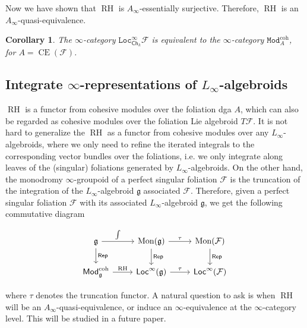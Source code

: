 \documentclass[12pt]{amsart}
\newtheorem{cor}[thm]{Corollary}
\theoremstyle{definition}
\theoremstyle{remark}
\numberwithin{equation}{section}
\newcommand{\CF}{{\mathcal F}}
\newcommand{\A}{{A}}
\newcommand{\1}{{\mathbb{1}}}
\newcommand{\g}{\mathfrak{g}}
\newcommand{\CE}{\operatorname{CE}}
\newcommand{\Mod}{\mathsf{Mod}}
\newcommand{\Modi}{\mathtt{Mod}}
\newcommand{\Ch}{\mathsf{Ch}}
\newcommand{\rep}{\mathsf{Rep}}
\newcommand{\Loc}{\mathsf{Loc}}
\newcommand{\loci}{\mathtt{Loc}}
\newcommand{\RH}{\operatorname{RH}}
\newcommand{\coh}{{\operatorname{coh}}}
\newcommand{\mon}{\operatorname{Mon}}
\newcommand{\li}{L_{\infty}}
\begin{document}
Now we have shown that $\RH$ is $A_{\infty}$-essentially surjective. Therefore, $\RH$ is an $A_{\infty}$-quasi-equivalence.

\begin{cor}
The $\infty$-category $\loci^{\infty}_{\Ch_k}\CF$ is equivalent to the $\infty$-category $\Modi_{\A}^{\coh}$, for $\A = \CE(\CF)$.
\end{cor}
\subsection{Integrate $\infty$-representations of $L_{\infty}$-algebroids}

$\RH$ is a functor from cohesive modules over the foliation dga $A$, which can also be regarded as cohesive modules over the foliation Lie algebroid $T\CF$. 
It is not hard to generalize the $\RH$ as a functor from cohesive modules over any $\li$-algebroids, where we only need to refine the iterated integrals to the corresponding vector bundles over the foliations, i.e. we only integrate along leaves of the (singular) foliations generated by  $\li$-algebroids. On the other hand, the monodromy $\infty$-groupoid of a perfect singular foliation $\CF$ is the truncation of the integration of the $\li$-algebroid $\g$ associated $\CF$. Therefore, given a perfect singular foliation $\CF$ with its associated $\li$-algebroid $\g$, we get the following commutative diagram

\begin{center}
    \begin{equation*}
        \begin{tikzcd}[ampersand replacement=\&]
{\g} \arrow[r, "\int"] \arrow[d, "\rep"] \& {\mon(\g)} \arrow[d, "\rep"]\arrow[r, "\tau"]\& {\mon(\CF)} \arrow[d, "\rep"] \\
{\Mod^{\coh}_{\g}} \arrow[r, "\RH"]                \& {\Loc^{\infty}(\g)} \arrow[r, "\tau"]     \& {\Loc^{\infty}(\CF)}     
\end{tikzcd}
    \end{equation*}
    \end{center}
    
where $\tau$ denotes the truncation functor.
A natural question to ask is when $\RH$ will be an $A_{\infty}$-quasi-equivalence, or induce an $\infty$-equivalence at the $\infty$-category level. This will be studied in a future paper.





\printindex

\nocite{*}
\printbibliography
\end{document}
